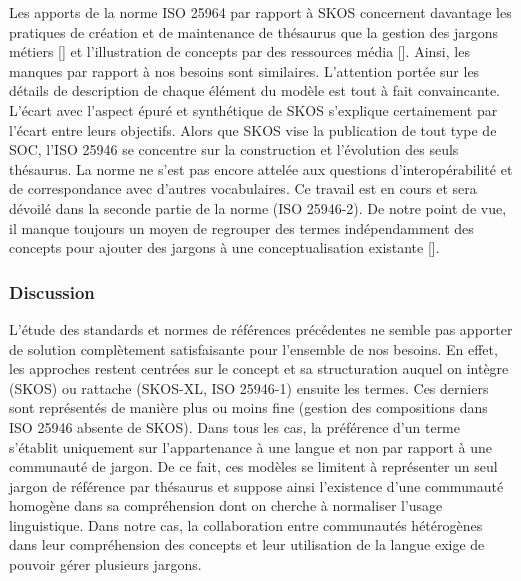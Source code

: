 Les apports de la norme ISO 25964 par rapport à SKOS concernent davantage les pratiques de création et de maintenance de thésaurus que la gestion des jargons métiers [] et l'illustration de concepts par des ressources média []. 
Ainsi, les manques par rapport à nos besoins sont similaires. L'attention portée sur les détails de description de chaque élément du modèle est tout à fait convaincante. 
L'écart avec l'aspect épuré et synthétique de SKOS s'explique certainement par l'écart entre leurs objectifs. 
Alors que SKOS vise la publication de tout type de SOC, l'ISO 25946 se concentre sur la construction et l'évolution des seuls thésaurus. 
La norme ne s'est pas encore attelée aux questions d'interopérabilité et de correspondance avec d'autres vocabulaires. Ce travail est en cours et sera dévoilé dans la seconde partie de la norme (ISO 25946-2). 
De notre point de vue, il manque toujours un moyen de regrouper des termes indépendamment des concepts pour ajouter des jargons à une conceptualisation existante [].





\subsubsection{Discussion}
L'étude des standards et normes de références précédentes ne semble pas apporter de solution complètement satisfaisante pour l'ensemble de nos besoins. 
En effet, les approches restent centrées sur le concept et sa structuration auquel on intègre (SKOS) ou rattache (SKOS-XL, ISO 25946-1) ensuite les termes. 
Ces derniers sont représentés de manière plus ou moins fine (gestion des compositions dans ISO 25946 absente de SKOS). 
Dans tous les cas, la préférence d'un terme s'établit uniquement sur l'appartenance à une langue et non par rapport à une communauté de jargon. %
De ce fait, ces modèles se limitent à représenter un seul jargon de référence par thésaurus et suppose ainsi l'existence d'une communauté homogène dans sa compréhension dont on cherche à normaliser l'usage linguistique. %
Dans notre cas, la collaboration entre communautés hétérogènes dans leur compréhension des concepts et leur utilisation de la langue exige de pouvoir gérer plusieurs jargons. 
